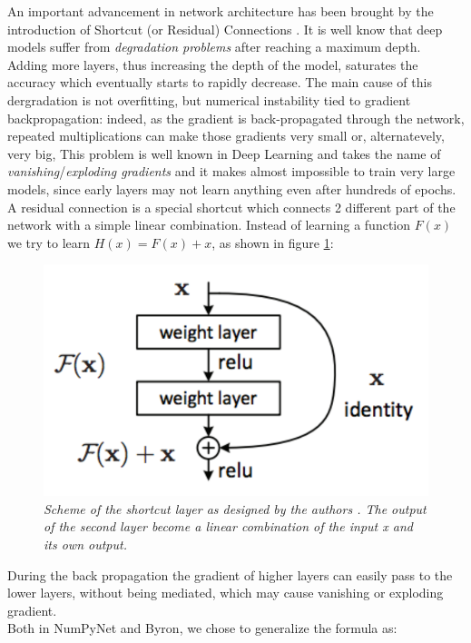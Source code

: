 \documentclass[12pt,a4paper]{report}
\begin{document}
An important advancement in network architecture has been brought by the introduction of Shortcut (or Residual) Connections \cite{residual}. It is well know that deep models suffer from {\it degradation problems} after reaching a maximum depth. Adding more layers, thus increasing the depth of the model, saturates the accuracy which eventually starts to rapidly decrease. 
The main cause of this dergradation is not overfitting, but numerical instability tied to gradient backpropagation: indeed, as the gradient is back-propagated through the network, repeated multiplications can make those gradients very small or, alternatevely, very big,
This problem is well known in Deep Learning and takes the name of {\it vanishing}/{\it exploding gradients} and it makes almost impossible to train very large models, since early layers may not learn anything even after hundreds of epochs.
A residual connection is a special shortcut which connects 2 different part of the network with a simple linear combination.
Instead of learning a function $F(x)$ we try to learn $H(x) = F(x) + x$, as shown in figure \ref{fig:shortcut}:

\begin{figure}[h]
 \centering
 \includegraphics[scale=0.4]{./images/shortcut.png}
 \caption{\it Scheme of the shortcut layer as designed by the authors \cite{residual}. The output of the second layer become a linear combination of the input x and its own output.}
 \label{fig:shortcut}
\end{figure}
During the back propagation the gradient of higher layers can easily pass to the lower layers, without being mediated, which may cause vanishing or exploding gradient.
\\
Both in NumPyNet and Byron, we chose to generalize the formula as: 
\end{document}
